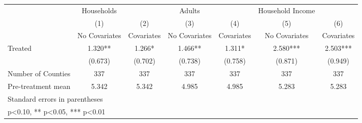 {
\def\sym#1{\ifmmode^{#1}\else\(^{#1}\)\fi}
\begin{tabular}{l*{6}{c}}
\hline\hline
            &  Households   &               &      Adults   &               &Household Income   &               \\
            &\multicolumn{1}{c}{(1)}&\multicolumn{1}{c}{(2)}&\multicolumn{1}{c}{(3)}&\multicolumn{1}{c}{(4)}&\multicolumn{1}{c}{(5)}&\multicolumn{1}{c}{(6)}\\
            &\multicolumn{1}{c}{No Covariates}&\multicolumn{1}{c}{Covariates}&\multicolumn{1}{c}{No Covariates}&\multicolumn{1}{c}{Covariates}&\multicolumn{1}{c}{No Covariates}&\multicolumn{1}{c}{Covariates}\\
\hline
Treated     &       1.320** &       1.266*  &       1.466** &       1.311*  &       2.580***&       2.503***\\
            &     (0.673)   &     (0.702)   &     (0.738)   &     (0.758)   &     (0.871)   &     (0.949)   \\
\hline
Number of Counties&         337   &         337   &         337   &         337   &         337   &         337   \\
Pre-treatment mean&       5.342   &       5.342   &       4.985   &       4.985   &       5.283   &       5.283   \\
\hline\hline
\multicolumn{7}{l}{\footnotesize Standard errors in parentheses}\\
\multicolumn{7}{l}{\footnotesize * p<0.10, ** p<0.05, *** p<0.01}\\
\end{tabular}
}
